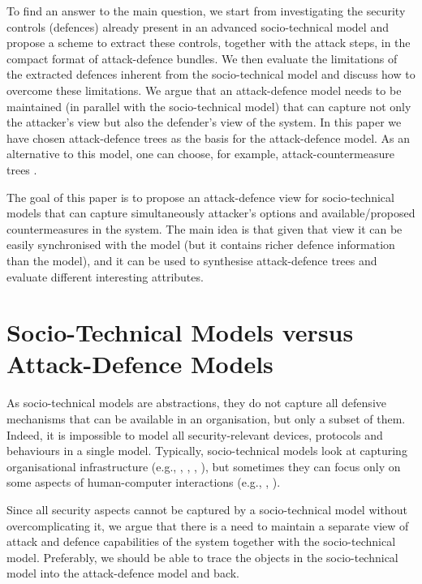 \documentclass{llncs}
\begin{document}
To find an answer to the main question, we start from investigating the security controls (defences) already present in an advanced socio-technical model and propose a scheme to extract these controls, together with the attack steps, in the compact format of attack-defence bundles. We then evaluate the limitations of the extracted defences inherent from the socio-technical model and discuss how to overcome these limitations. We argue that an attack-defence model needs to be maintained (in parallel with the socio-technical model) that can capture not only the attacker's view but also the defender's view of the system. In this paper we have chosen attack-defence trees \cite{Kordy-JLC-2014} as the basis for the attack-defence model. As an alternative to this model, one can choose, for example, attack-countermeasure trees \cite{Roy-SCN-2011}.



The goal of this paper is to propose an attack-defence view for socio-technical models that can capture simultaneously attacker's options and available/proposed countermeasures in the system. The main idea is that given that view it can be easily synchronised with the model (but it contains richer defence information than the model), and it can be used to synthesise attack-defence trees and evaluate different interesting attributes. 

\section{Socio-Technical Models versus Attack-Defence Models}\label{sec:motivation}


As socio-technical models are abstractions, they do not capture all defensive mechanisms that can be available in an organisation, but only a subset of them. Indeed, it is impossible to model all security-relevant devices, protocols and behaviours in a single model. Typically, socio-technical models look at capturing organisational infrastructure (e.g., \cite{D1.3.1}, \cite{ANKH}, \cite{Exasym-2008}, \cite{Lenzini-2015}), but sometimes they can focus only on some aspects of human-computer interactions (e.g., \cite{Radomirovic-2015}, \cite{STEAL-2014}).



Since all security aspects cannot be captured by a socio-technical model without overcomplicating it, we argue that there is a need to maintain a separate view of attack and defence capabilities of the system together with the socio-technical model. Preferably, we should be able to trace the objects in the socio-technical model into the attack-defence model and back. 
\end{document}
